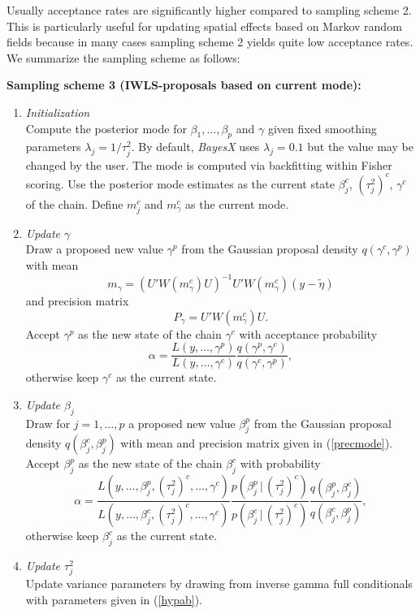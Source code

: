 Usually acceptance rates are significantly higher compared to
sampling scheme 2. This is particularly useful for updating
spatial effects based on Markov random fields because in many
cases sampling scheme 2 yields quite low acceptance rates. We
summarize the sampling scheme as follows:

{\bf Sampling scheme 3 (IWLS-proposals based on current mode):}

\begin{enumerate}
\item {\em Initialization} \\
Compute the posterior mode for $\beta_1,\dots,\beta_p$ and
$\gamma$ given fixed smoothing parameters $\lambda_j =
1/\tau^2_j$. By default, {\em BayesX} uses $\lambda_j = 0.1$ but
the value may be changed by the user. The mode is computed via
backfitting within Fisher scoring. Use the posterior mode
estimates as the current state $\beta_j^c$, $(\tau_j^2)^c$,
$\gamma^c$ of the chain. Define $m_j^c$ and $m_{\gamma}^c$ as the
current mode.
\item {\em Update $\gamma$} \\
Draw a proposed new value $\gamma^p$ from the Gaussian proposal
density $q(\gamma^c,\gamma^p)$ with mean
$$
m_{\gamma} = (U' W(m_{\gamma}^c) U)^{-1}U' W(m_{\gamma}^c)
(y-\tilde{\eta} )
$$
and precision matrix
$$
P_{\gamma} = U' W(m_{\gamma}^c) U.
$$
Accept $\gamma^p$ as the new state of the chain $\gamma^c$ with
acceptance probability
$$
\alpha = \frac{ L(y,\dots,\gamma^p)} {L(y,\dots,\gamma^c)} \frac{
q(\gamma^p,\gamma^c)}{q(\gamma^c,\gamma^p)},
$$
otherwise keep $\gamma^c$ as the current state.
\item {\em Update $\beta_j$} \\
Draw for $j=1,\dots,p$ a proposed new value $\beta_j^p$ from the
Gaussian proposal density $q(\beta_j^c,\beta_j^p)$ with mean and
precision matrix given in (\ref{precmode}). Accept $\beta^p_j$ as
the new state of the chain $\beta_j^c$ with probability
$$
\alpha = \frac{
L(y,\dots,\beta^{p}_j,(\tau_j^2)^{c},\dots,\gamma^c)}
{L(y,\dots,\beta^{c}_j,(\tau_j^2)^{c},\dots,\gamma^c)}
\frac{p(\beta_j^p \, | \, (\tau_j^2)^c)}{p(\beta_j^c \, | \,
(\tau_j^2)^c)} \frac{
q(\beta_j^p,\beta_j^c)}{q(\beta_j^c,\beta_j^p)},
$$
otherwise keep $\beta_j^c$ as the current state.
\item {\em Update $\tau^2_j$} \\
Update variance parameters by drawing from inverse gamma full
conditionals with parameters given in (\ref{hypab}).
\end{enumerate}


